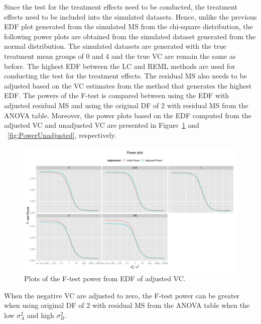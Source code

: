 \documentclass[12pt,a4paper]{article}
\begin{document}
Since the test for the treatment effects need to be conducted, the treatment effects need to be included into the simulated datasets. Hence, unlike the previous EDF plot generated from the simulated MS from the chi-square distribution, the following power plots are obtained from the simulated dataset generated from the normal distribution. The simulated datasets are generated with the true treatment mean groups of 0 and 4 and the true VC are remain the same as before. The highest EDF between the LC and REML methods are used for conducting the test for the treatment effects. The residual MS also needs to be adjusted based on the VC estimates from the method that generates the highest EDF. The powers of the F-test is compared between using the EDF with adjusted residual MS and using the original DF of 2 with residual MS from the ANOVA table. Moreover, the power plots based on the EDF computed from the adjusted VC and unadjusted VC are presented in Figure~\ref{fig:PowerAdjusted} and ~\ref{fig:PowerUnadjusted}, respectively.

\begin{figure}[ht]
\centering
\includegraphics[width=1 \textwidth]{Graph/adjustZeroPowerEDF.pdf}
\caption{Plots of the F-test power from EDF of adjusted VC.}
\label{fig:PowerAdjusted}
\end{figure}

When the negative VC are adjusted to zero, the F-test power can be greater when using original DF of 2 with residual MS from the ANOVA table when the low $\sigma_A^2$ and high $\sigma_R^2$. 
\end{document}
